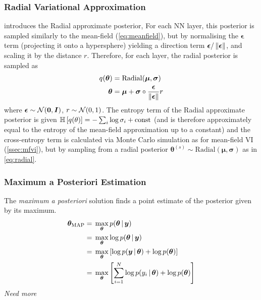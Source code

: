 \documentclass[10pt,a4paper,twocolumn]{article}
\begin{document}
\subsubsection{Radial Variational Approximation}
\textcite{farquhar2020radial} introduces the Radial approximate posterior,
For each NN layer, this posterior is sampled similarly to the mean-field (\cref{eq:meanfield}), but by normalising the \(\bm{\epsilon}\) term (projecting it onto a hypersphere) yielding a direction term \(\bm{\epsilon}/\left\lVert\bm{\epsilon}\right\rVert\), and scaling it by the distance \(r\).
Therefore, for each layer, the radial posterior is sampled as
\begin{align}\label{eq:radial}
    q(\bm \theta) ={} & \mathrm{Radial}(\bm{\mu}, \bm{\sigma}) \nonumber                          \\
    \bm{\theta} ={}   & \bm{\mu} + \bm{\sigma} \circ \frac{\bm{\epsilon}}{\left\lVert\bm{\epsilon}\right\rVert} r
\end{align}
where \(\bm{\epsilon} \sim \mathcal{N}(\bm{0}, \bm{I})\), \(r \sim \mathcal{N}(0, 1)\).
The entropy term of the Radial approximate posterior is given
\(\mathbb{H}\left[q(\theta)\right] = - \sum_i \log \sigma_i + \mathrm{const}\) (and is therefore approximately equal to the entropy of the mean-field approximation up to a constant) and the cross-entropy term is calculated via Monte Carlo simulation as for mean-field VI (\cref{ssec:mfvi}), but by sampling from a radial posterior \(\bm{\theta}^{(s)} \sim \mathrm{Radial}(\bm{\mu}, \bm{\sigma})\) as in \cref{eq:radial}.

\subsubsection{Maximum a Posteriori Estimation}
The \emph{maximum a posteriori} solution finds a point estimate of the posterior given by its maximum.
\begin{align}
    \bm \theta_\mathrm{MAP}
    ={} & \max_{\bm \theta} p(\bm \theta \, | \, \bm y) \nonumber                                           \\
    ={} & \max_{\bm \theta} \log p(\bm \theta \, | \, \bm y) \nonumber                                      \\
    ={} & \max_{\bm \theta} \left[ \log p(\bm y \, | \, \bm \theta) + \log p(\bm \theta) \right] \nonumber  \\
    ={} & \max_{\bm \theta} \left[ \sum_{i=1}^N \log p(y_i \, | \, \bm \theta) + \log p(\bm \theta) \right]
\end{align}
\emph{Need more}
\end{document}
